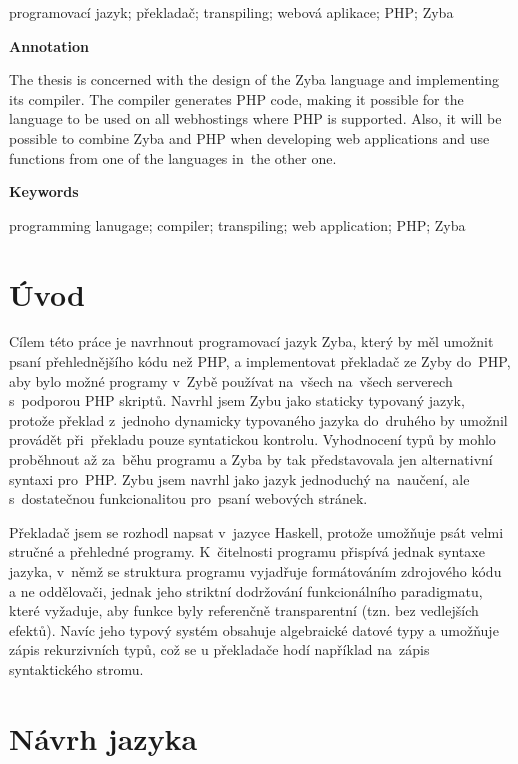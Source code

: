 \documentclass[a4paper,12pt]{article}
\begin{document}
programovací jazyk; překladač; transpiling; webová aplikace; PHP; Zyba

\Large\textbf{Annotation}\normalsize

The thesis is concerned with the design of the Zyba language and implementing its compiler. The compiler generates PHP code, making it possible for the language to be used on all webhostings where PHP is supported. Also, it will be possible to combine Zyba and PHP when developing web applications and use functions from one of the languages in~the other one.

\Large\textbf{Keywords}\normalsize

programming lanugage; compiler; transpiling; web application; PHP; Zyba
\newpage
\thispagestyle{empty}
\tableofcontents
\newpage
\section{Úvod}
Cílem této práce je navrhnout programovací jazyk Zyba, který by měl umožnit psaní přehlednějšího kódu než PHP, a implementovat překladač ze Zyby do~PHP, aby bylo možné programy v~Zybě používat na~všech na~všech serverech s~podporou PHP skriptů. Navrhl jsem Zybu jako staticky typovaný jazyk, protože překlad z~jednoho dynamicky typovaného jazyka do~druhého by umožnil provádět při~překladu pouze syntatickou kontrolu. Vyhodnocení typů by mohlo proběhnout až za~běhu programu a Zyba by tak představovala jen alternativní syntaxi pro~PHP. Zybu jsem navrhl jako jazyk jednoduchý na~naučení, ale s~dostatečnou funkcionalitou pro~psaní webových stránek.

Překladač jsem se rozhodl napsat v~jazyce Haskell, protože umožňuje psát velmi stručné a přehledné programy. K~čitelnosti programu přispívá jednak syntaxe jazyka, v~němž se struktura programu vyjadřuje formátováním zdrojového kódu a ne oddělovači, jednak jeho striktní dodržování funkcionálního paradigmatu, které vyžaduje, aby funkce byly referenčně transparentní (tzn. bez vedlejších efektů). Navíc jeho typový systém obsahuje algebraické datové typy a umožňuje zápis rekurzivních typů, což se u překladače hodí například na~zápis syntaktického stromu.

\section{Návrh jazyka}
\end{document}
